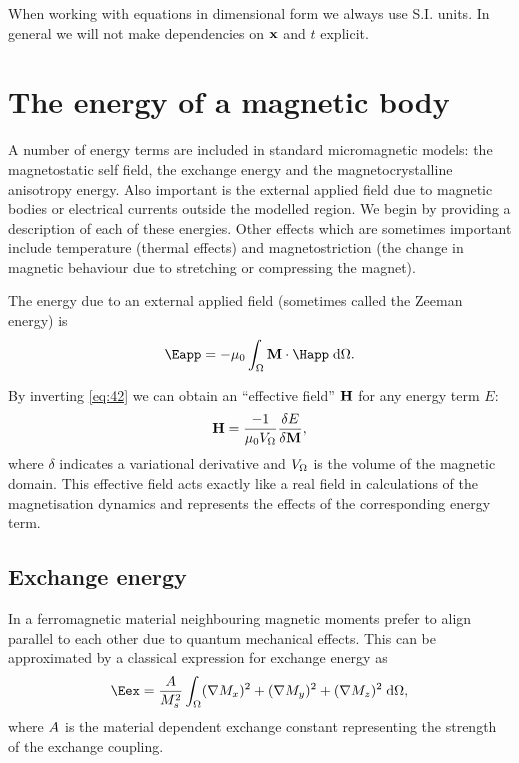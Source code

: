 When working with equations in dimensional form we always use S.I. units.
In general we will not make dependencies on $\boldsymbol{\mathrm{x}}$ and $t$ explicit.




\section{The energy of a magnetic body}
\label{sec:energy-magnetic-body}

A number of energy terms are included in standard micromagnetic models: the magnetostatic self field, the exchange energy and the magnetocrystalline anisotropy energy.
Also important is the external applied field due to magnetic bodies or electrical currents outside the modelled region.
We begin by providing a description of each of these energies.
Other effects which are sometimes important include temperature (thermal effects) and magnetostriction (the change in magnetic behaviour due to stretching or compressing the magnet).

The energy due to an external applied field (sometimes called the Zeeman energy) is
\begin{equation}
  \label{eq:42}
  \Eapp = - \mu_0 \int_{\magd} \Mv \cdot \Happ \d \magd.
\end{equation}

By inverting \cref{eq:42} we can obtain an ``effective field'' $\boldsymbol{\mathrm{H}}$ for any energy term $E$:
\begin{equation}
  \boldsymbol{\mathrm{H}} = \dfrac{-1}{\mu_0V_{\Omega}} \dfrac{\delta E}{\delta \boldsymbol{\mathrm{M}}},
  \label{eq:62}
\end{equation}
where $\delta$ indicates a variational derivative and $V_{\Omega}$ is the volume of the magnetic domain.
This effective field acts exactly like a real field in calculations of the magnetisation dynamics and represents the effects of the corresponding energy term.



\subsection{Exchange energy}

In a ferromagnetic material neighbouring magnetic moments prefer to align parallel to each other due to quantum mechanical effects.
This can be approximated by a classical expression for exchange energy \cite{Aharoni1996} as
\begin{equation}
  \label{eq:39}
  \Eex =  \frac{\Exchc}{M_s^2} \int_{\magd} (\nabla M_x)^2  + (\nabla M_y)^2  + (\nabla M_z)^2 \d \magd,
\end{equation}
where $A$ is the material dependent exchange constant representing the strength of the exchange coupling.

